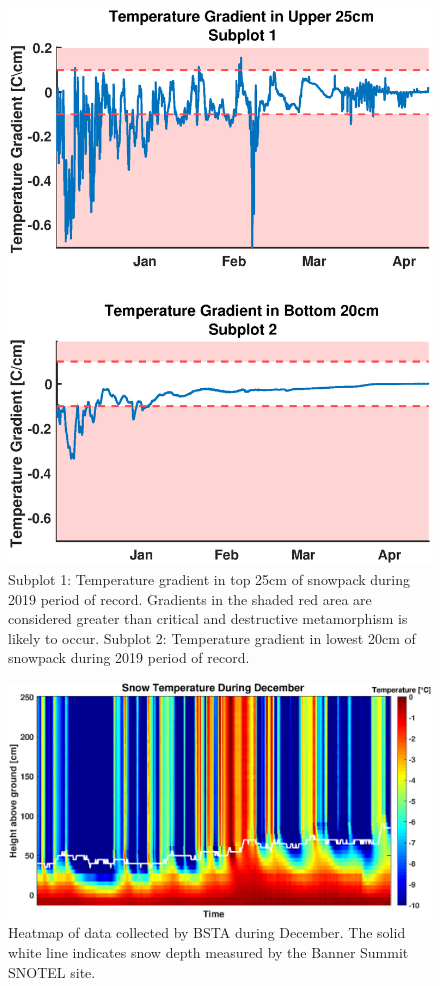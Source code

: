  \begin{figure}[H]
    \centering
    \includegraphics[width=0.8\linewidth]{figures/TempGrad/WY2019_GradMaster.eps}
    \caption{Subplot 1: Temperature gradient in top 25cm of snowpack during 2019 period of record. Gradients in the shaded red area are considered greater than critical and destructive metamorphism is likely to occur. Subplot 2: Temperature gradient in lowest 20cm of snowpack during 2019 period of record.}
    \label{fig:WY2019_GradMaster}
 \end{figure}

 
\begin{figure}[H]
    \centering
    \includegraphics[width=0.95\linewidth]{figures/TempGrad/Dec_Heatmap.eps}
    \caption{Heatmap of data collected by BSTA during December. The solid white line indicates snow depth measured by the Banner Summit SNOTEL site.}
    \label{fig:Dec_U25_RDH}
 \end{figure}
 
